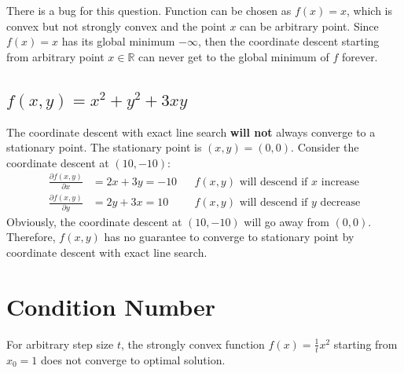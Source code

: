\documentclass[11pt,a4paper]{article}
\begin{document}
\begin{remark}
    There is a bug for this question. Function can be chosen as $f(x) = x$, which
    is convex but not strongly convex and the point $x$ can be arbitrary
    point. Since $f(x) = x$ has its global minimum $-\infty$, then the
    coordinate descent starting from arbitrary point $x \in \mathbb{R}$ can  
    never get to the global minimum of $f$ forever. 
\end{remark}

\subsection{$f(x,y) = x^2 + y^2 + 3xy$}
The coordinate descent with exact line search {\bf will not} always
converge to a stationary point. The stationary point is $(x,y) = (0, 0)$.
Consider the coordinate descent at $(10, -10)$: 
\begin{align}
    \frac{\partial f(x,y)}{\partial x} &= 2x + 3y = -10 
    && f(x,y) \text{ will descend if } x \text{ increase} \\
    \frac{\partial f(x,y)}{\partial y} &= 2y + 3x = 10
    && f(x,y) \text{ will descend if } y \text{ decrease}
\end{align}
Obviously, the coordinate descent at $(10, -10)$ will go away from $(0,0)$.
Therefore, $f(x,y)$ has no guarantee to converge to stationary point by
coordinate descent with exact line search.

\newpage
\section{Condition Number}
For arbitrary step size $t$, the strongly convex function $f(x) = \frac{1}{t}
x^2$ starting from $x_0 = 1$ does not converge to optimal solution. 
\end{document}
